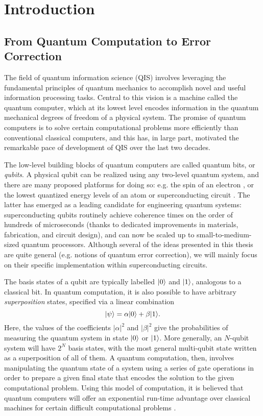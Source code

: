 \chapter{Introduction\label{ch:1_Introduction}}

\section{From Quantum Computation to Error Correction}

The field of quantum information science (QIS) involves leveraging the fundamental principles of quantum mechanics to accomplish novel and useful information processing tasks. Central to this vision is a machine called the quantum computer, which at its lowest level encodes information in the quantum mechanical degrees of freedom of a physical system. The promise of quantum computers is to solve certain computational problems more efficiently than conventional classical computers, and this has, in large part, motivated the remarkable pace of development of QIS over the last two decades. 

The low-level building blocks of quantum computers are called quantum bits, or \textit{qubits}. A physical qubit can be realized using any two-level quantum system, and there are many proposed platforms for doing so: e.g. the spin of an electron \cite{burkard2023semiconductor}, or the lowest quantized energy levels of an atom \cite{briegel2000quantum} or superconducting circuit \cite{devoret2013superconducting, krantz2019quantum, kjaergaard2020superconducting}. The latter has emerged as a leading candidate for engineering quantum systems: superconducting qubits routinely achieve coherence times on the order of hundreds of microseconds \cite{kjaergaard2020superconducting} (thanks to dedicated improvements in materials, fabrication, and circuit design), and can now be scaled up to small-to-medium-sized quantum processors. Although several of the ideas presented in this thesis are quite general (e.g. notions of quantum error correction), we will mainly focus on their specific implementation within superconducting circuits. 

The basis states of a qubit are typically labelled $\lvert0\rangle$ and $\lvert1\rangle$, analogous to a classical bit. In quantum computation, it is also possible to have arbitrary \textit{superposition} states, specified via a linear combination
\begin{equation}
    \lvert\psi\rangle = \alpha\lvert0\rangle + \beta\lvert1\rangle.
\end{equation}
Here, the values of the coefficients $|\alpha|^2$ and $|\beta|^2$ give the probabilities of measuring the quantum system in state $\lvert0\rangle$ or $\lvert1\rangle$. More generally, an $N$-qubit system will have $2^N$ basis states, with the most general multi-qubit state written as a superposition of all of them. A quantum computation, then, involves manipulating the quantum state of a system using a series of gate operations in order to prepare a given final state that encodes the solution to the given computational problem. Using this model of computation, it is believed that quantum computers will offer an exponential run-time advantage over classical machines for certain difficult computational problems \cite{manenti2023quantum, ike-and-mike}. 

